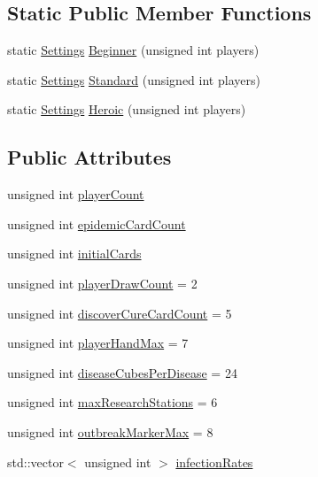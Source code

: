 \subsection*{Static Public Member Functions}
\begin{DoxyCompactItemize}
\item 
static \hyperlink{classpan_1_1_settings}{Settings} \hyperlink{classpan_1_1_settings_a908b6305091cf8d02bb4179dcbbe4ad1}{Beginner} (unsigned int players)
\item 
static \hyperlink{classpan_1_1_settings}{Settings} \hyperlink{classpan_1_1_settings_a272d0e01c6e60dcfa1958c9ae54ff69f}{Standard} (unsigned int players)
\item 
static \hyperlink{classpan_1_1_settings}{Settings} \hyperlink{classpan_1_1_settings_af0212489163b1d55fc5e661ad85a0b1e}{Heroic} (unsigned int players)
\end{DoxyCompactItemize}
\subsection*{Public Attributes}
\begin{DoxyCompactItemize}
\item 
unsigned int \hyperlink{classpan_1_1_settings_a4a7c2963d63bd768b9e64ffb8461333f}{player\+Count}
\item 
unsigned int \hyperlink{classpan_1_1_settings_a61569c8a2fcccdf9409d5467625ee788}{epidemic\+Card\+Count}
\item 
unsigned int \hyperlink{classpan_1_1_settings_adf8144ec33fa2217b8fc422e7b4806be}{initial\+Cards}
\item 
unsigned int \hyperlink{classpan_1_1_settings_adb30d858a479ca96e0f7d3591bf77746}{player\+Draw\+Count} = 2
\item 
unsigned int \hyperlink{classpan_1_1_settings_a6702806d498f37822811241a2a8f7ab3}{discover\+Cure\+Card\+Count} = 5
\item 
unsigned int \hyperlink{classpan_1_1_settings_a189fdd9a58dc25ca3f8766be031eba99}{player\+Hand\+Max} = 7
\item 
unsigned int \hyperlink{classpan_1_1_settings_a85ce29ab84bb000a19f31eb00c7134ed}{disease\+Cubes\+Per\+Disease} = 24
\item 
unsigned int \hyperlink{classpan_1_1_settings_ab3fc24065a6f74fc63a6f171ffc8fea2}{max\+Research\+Stations} = 6
\item 
unsigned int \hyperlink{classpan_1_1_settings_a437e7eaf47786919ebd3504100d5ac68}{outbreak\+Marker\+Max} = 8
\item 
std\+::vector$<$ unsigned int $>$ \hyperlink{classpan_1_1_settings_a9b9d37ca162c63ab759271fd21e7b15f}{infection\+Rates}
\end{DoxyCompactItemize}
